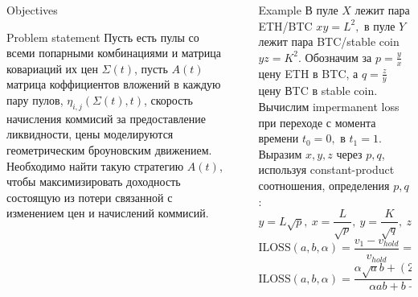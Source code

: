 \documentclass[]{beamer}
\begin{document}
\begin{frame}[t]
\begin{columns}[t]
\begin{column}{\onecolwid}
\begin{alertblock}{Objectives}
    \end{alertblock}
    
    \begin{block}{Problem statement}
    Пусть есть пулы со всеми попарными комбинациями и матрица ковариаций их цен $ \Sigma(t)$, пусть $A(t)$ матрица коффициентов вложений в каждую пару пулов, 
    $\eta_{i,j}(\Sigma(t), t)$, скорость начисления коммисий за предоставление ликвидности, цены моделируются геометрическим броуновским движением.
    Необходимо найти такую стратегию $A(t)$, чтобы максимизировать доходность состоящую из потери связанной с изменением цен и начислений коммисий.

    \end{block}
    
    
    \end{column} %
    
    \begin{column}{\sepwid}\end{column} %
    
    \begin{column}{\twocolwid} %
    
    \begin{columns}[t,totalwidth=\twocolwid] %
    
    \begin{column}{\onecolwid}\vspace{-.6in} %
    
    
    \begin{block}{Example}
        В пуле $X$ лежит пара ETH/BTC $xy = L^2, $ в пуле $Y$ лежит пара BTC/stable coin $ yz = K^2.$
        Обозначим за $p = \frac{y}{x}$ цену ETH в BTC, а $q = \frac{z}{y}$ цену ВTC в stable coin. Вычислим impermanent loss при переходе с момента времени $t_0 = 0,$ в $t_1 = 1.$
        Выразим $x, y, z$ через $p, q$, используя constant-product соотношения, определения $p, q$:
        $$ y = L \sqrt{p}, \ x = \frac{L}{\sqrt{p}}, \  y = \frac{K} {\sqrt{q}}, \ z = K \sqrt{q}. $$
        $$ \text{ILOSS}(a, b, \alpha) = \frac{v_1 - v_{hold}}{v_{hold}} = \frac{v_1}{v_{hold}} - 1, $$
        $$\text{ILOSS}(a, b, \alpha) = \frac{\alpha \sqrt{a}b + (2- \alpha)\sqrt{b}}{\alpha ab + b + 1 - \alpha} - 1$$ 
        

\end{block}
\end{column}
\end{columns}
\end{column}
\end{columns}
\end{frame}
\end{document}
